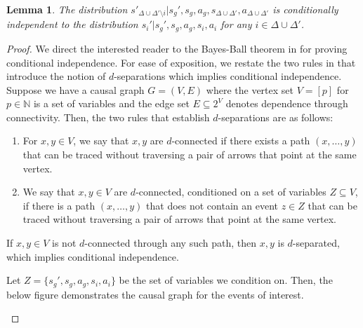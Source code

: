 \documentclass{article}
\theoremstyle{plain}
\newtheorem{lemma}[theorem]{Lemma}
\theoremstyle{definition}
\begin{document}
\begin{lemma}\label{bayes_ball_cond_ind_lemma}
The distribution $s'_{\Delta\cup\Delta'\setminus i}|s_g',s_g,a_g,s_{\Delta\cup\Delta'},a_{\Delta\cup\Delta'}$ is conditionally independent to the distribution $s_i'|s_g',s_g,a_g,s_{i},a_{i}$ for any $i\in\Delta\cup\Delta'$.
\end{lemma}
\begin{proof}
 We direct the interested reader to the Bayes-Ball theorem in \cite{shachter2013bayesball} for proving conditional independence. For ease of exposition, we restate the two rules in \cite{shachter2013bayesball} that introduce the notion of $d$-separations which implies conditional independence. Suppose we have a causal graph $G=(V,E)$ where the vertex set $V=[p]$ for $p\in\mathbb{N}$ is a set of variables and the edge set $E \subseteq 2^V$ denotes dependence through connectivity. Then, the two rules that establish $d$-separations are as follows: 
 \begin{enumerate}
     \item For $x,y\in V$, we say that $x,y$ are $d$-connected if there exists a path $(x,\dots, y)$ that can be traced without traversing a pair of arrows that point at the same vertex. 
     \item We say that $x,y\in V$ are $d$-connected, conditioned on a set of variables $Z\subseteq V$, if there is a path $(x,\dots, y)$ that does not contain an event $z\in Z$ that can be traced without traversing a pair of arrows that point at the same vertex.
 \end{enumerate}  If $x,y\in V$ is not $d$-connected through any such path, then $x, y$ is $d$-separated, which implies conditional independence.

Let $Z = \{s_g',s_g,a_g,s_i, a_i\}$ be the set of variables we condition on. Then, the below figure demonstrates the causal graph for the events of interest.
\begin{figure}[hbt!]
\begin{center}
\end{center}
\end{figure}
\end{proof}
\end{document}
